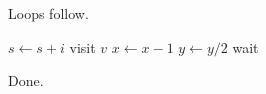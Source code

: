 \documentclass{article}
\begin{document}
Loops follow.

\begin{algorithm}[h]
\caption{Loops}
\begin{algorithmic}[1]
\STATE $s \gets s + i$
\ENDFOR
{}
\STATE visit $v$
\ENDFOR
{}
\STATE $x \gets x - 1$
\ENDWHILE
\REPEAT
\STATE $y \gets y / 2$
\LOOP
\STATE wait
\ENDLOOP
\end{algorithmic}
\end{algorithm}

Done.
\end{document}
